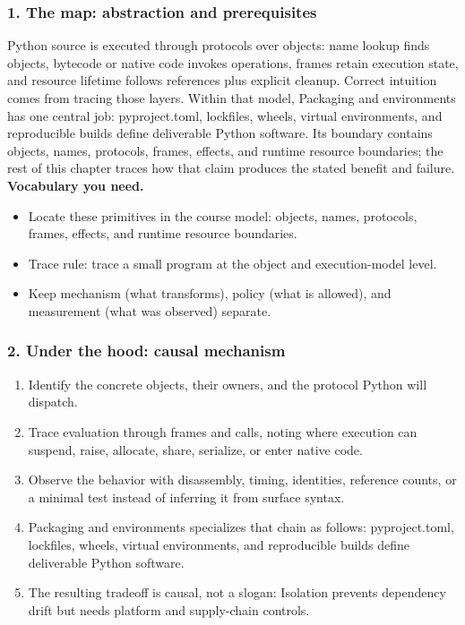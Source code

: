\subsubsection*{1. The map: abstraction and prerequisites}
Python source is executed through protocols over objects: name lookup finds objects, bytecode or native code invokes operations, frames retain execution state, and resource lifetime follows references plus explicit cleanup. Correct intuition comes from tracing those layers.
Within that model, Packaging and environments has one central job: pyproject.toml, lockfiles, wheels, virtual environments, and reproducible builds define deliverable Python software. Its boundary contains objects, names, protocols, frames, effects, and runtime resource boundaries; the rest of this chapter traces how that claim produces the stated benefit and failure.
\textbf{Vocabulary you need.}\begin{itemize}
\item Locate these primitives in the course model: objects, names, protocols, frames, effects, and runtime resource boundaries.
\item Trace rule: trace a small program at the object and execution-model level.
\item Keep mechanism (what transforms), policy (what is allowed), and measurement (what was observed) separate.
\end{itemize}
\subsubsection*{2. Under the hood: causal mechanism}\begin{enumerate}
\item Identify the concrete objects, their owners, and the protocol Python will dispatch.
\item Trace evaluation through frames and calls, noting where execution can suspend, raise, allocate, share, serialize, or enter native code.
\item Observe the behavior with disassembly, timing, identities, reference counts, or a minimal test instead of inferring it from surface syntax.
\item Packaging and environments specializes that chain as follows: pyproject.toml, lockfiles, wheels, virtual environments, and reproducible builds define deliverable Python software.
\item The resulting tradeoff is causal, not a slogan: Isolation prevents dependency drift but needs platform and supply-chain controls.
\end{enumerate}
